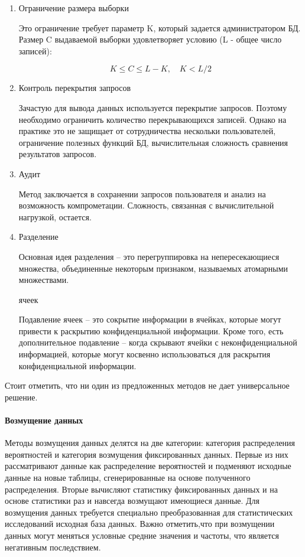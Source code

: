 \begin{enumerate}
  
  \item Ограничение размера выборки

Это ограничение требует параметр K, который задается администратором БД. Размер C выдаваемой выборки удовлетворяет условию (L - общее число записей):

\begin{displaymath}
K \leq C \leq L - K, \quad K < L/2
\end{displaymath}

  \item Контроль перекрытия запросов
  
Зачастую для вывода данных используется перекрытие запросов. Поэтому необходимо ограничить количество перекрывающихся записей. Однако на практике это не защищает от сотрудничества нескольки пользователей, ограничение полезных функций БД, вычислительная сложность сравнения результатов запросов.

  \item Аудит
  
Метод заключается в сохранении запросов пользователя и анализ на возможность компрометации. Сложность, связанная с вычислительной нагрузкой, остается.

  \item Разделение
  
Основная идея разделения -- это перегруппировка на непересекающиеся множества, объединенные некоторым признаком, называемых атомарными множествами.

   ячеек
  
Подавление ячеек -- это сокрытие информации в ячейках, которые могут привести к раскрытию конфиденциальной информации. Кроме того, есть дополнительное подавление -- когда скрывают ячейки с неконфиденциальной информацией, которые могут косвенно использоваться для раскрытия конфиденциальной информации.

\end{enumerate}

Стоит отметить, что ни один из предложенных методов не дает универсальное решение.

\paragraph{Возмущение данных}

Методы возмущения данных делятся на две категории: категория распределения вероятностей и категория возмущения фиксированных данных. Первые из них рассматривают данные как распределение вероятностей и подменяют исходные данные на новые таблицы, сгенерированные на основе полученного распределения. Вторые вычисляют статистику фиксированных данных и на основе статистики раз и навсегда возмущают имеющиеся данные. Для возмущения данных требуется специально преобразованная для статистических исследований исходная база данных. Важно отметить,что при возмущении данных могут меняться условные средние значения и частоты, что является негативным последствием.

